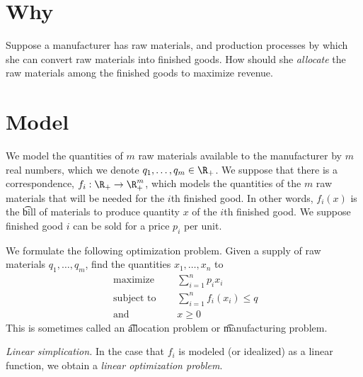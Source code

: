 
\section*{Why}

Suppose a manufacturer has raw materials, and production processes by which she can convert raw materials into finished goods.
How should she \textit{allocate} the raw materials among the finished goods to maximize revenue.

\section*{Model}

We model the quantities of $m$ raw materials available to the manufacturer by $m$ real numbers, which we denote $q_1, \dots , q_m \in \R _+$.
We suppose that there is a correspondence, $f_i: \R _+ \to \R _+^m$, which models the quantities of the $m$ raw materials that will be needed for the $i$th finished good.
In other words, $f_i(x)$ is the \t{bill of materials} to produce quantity $x$ of the $i$th finished good.
We suppose finished good $i$ can be sold for a price $p_i$ per unit.

We formulate the following optimization problem.
Given a supply of raw materials $q_1, \dots , q_m$, find the quantities $x_1, \dots , x_n$ to
\[
\begin{aligned}
\text{ maximize } \quad & \textstyle \sum_{i = 1}^{n} p_i x_i \\
\text{ subject to } \quad & \textstyle \sum_{i = 1}^{n} f_i(x_i) \leq q \\
\text{ and } \quad & x \geq 0
\end{aligned}
\]
This is sometimes called an \t{allocation problem} or \t{manufacturing problem}.

\textit{Linear simplication.}
In the case that $f_i$ is modeled (or idealized) as a linear function, we obtain a \textit{linear optimization problem}.

\blankpage